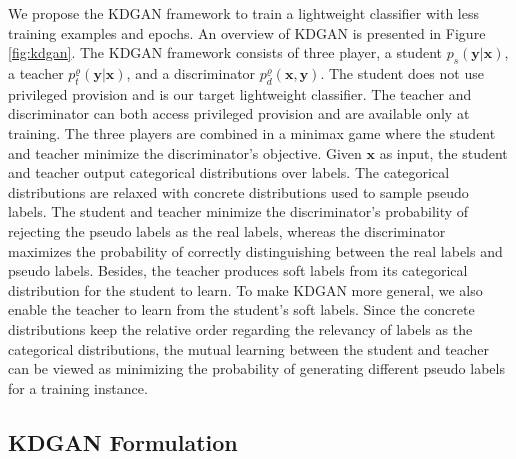 \documentclass{article}
\newcommand{\OVEC}[1]{\bm{#1}} %
\newcommand{\fullpstd}[1]{p_{s}(#1|\OVEC{x})}
\newcommand{\fullptch}[1]{p_{t}^{\varrho}(#1|\OVEC{x})}
\newcommand{\fullpdis}[1]{p_{d}^{\varrho}(\OVEC{x},#1)}
\begin{document}
We propose the KDGAN framework to train a lightweight classifier with less training examples and epochs.
An overview of KDGAN is presented in Figure \ref{fig:kdgan}.
The KDGAN framework consists of three player, a student $\fullpstd{\OVEC{y}}$, a teacher $\fullptch{\OVEC{y}}$, and a discriminator $\fullpdis{\OVEC{y}}$.
The student does not use privileged provision and is our target lightweight classifier.
The teacher and discriminator can both access privileged provision and are available only at training.
The three players are combined in a minimax game where the student and teacher minimize the discriminator's objective.
Given $\OVEC{x}$ as input, the student and teacher output categorical distributions over labels.
The categorical distributions are relaxed with concrete distributions used to sample pseudo labels.
The student and teacher minimize the discriminator's probability of rejecting the pseudo labels as the real labels, whereas the discriminator maximizes the probability of correctly distinguishing between the real labels and pseudo labels.
Besides, the teacher produces soft labels from its categorical distribution for the student to learn.
To make KDGAN more general, we also enable the teacher to learn from the student's soft labels.
Since the concrete distributions keep the relative order regarding the relevancy of labels as the categorical distributions, the mutual learning between the student and teacher can be viewed as minimizing the probability of generating different pseudo labels for a training instance.

\subsection{KDGAN Formulation} \label{sec:kdgan formulation}
\end{document}
